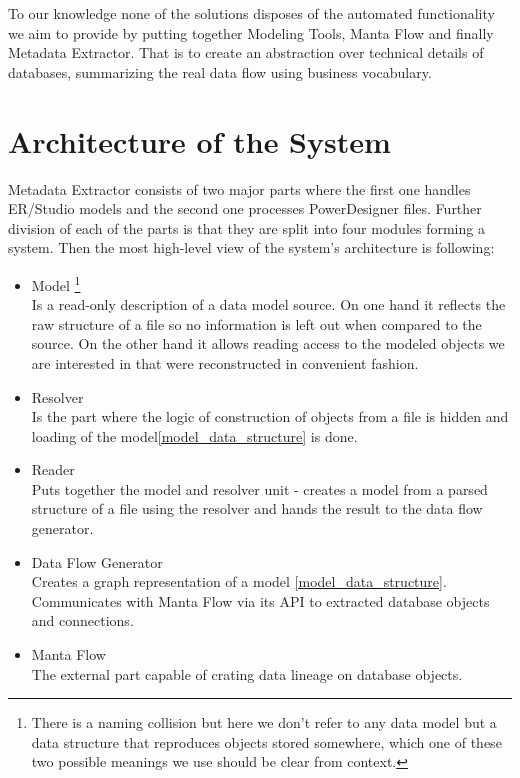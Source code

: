 To our knowledge none of the solutions disposes of the automated functionality we aim to provide by putting together Modeling Tools, Manta Flow and finally Metadata Extractor. That is to create an abstraction over technical details of databases, summarizing the real data flow using business vocabulary.

\section{Architecture of the System}

Metadata Extractor consists of two major parts where the first one handles ER/Studio models and the second one processes PowerDesigner files.
Further division of each of the parts is that they are split into four modules forming a system. 
Then the most high-level view of the system's architecture is following:
\begin{itemize}
	\item Model \label{model_data_structure}\footnote{There is a naming collision but here we don't refer to any data model but a data structure that reproduces objects stored somewhere, which one of these two possible meanings we use should be clear from context.}\\ 
	Is a read-only description of a data model source. On one hand it reflects the raw structure of a file so no information is left out when compared to the source. 
	On the other hand it allows reading access to the modeled objects we are interested in that were reconstructed in convenient fashion. 
	\item Resolver \\ 
	Is the part where the logic of construction of objects from a file is hidden and loading of the model\ref{model_data_structure} is done. 
	\item Reader \\
	Puts together the model and resolver unit - creates a model from a parsed structure of a file using the resolver and hands the result to the data flow generator.
	\item Data Flow Generator \\ 
	Creates a graph representation of a model \ref{model_data_structure}. Communicates with Manta Flow via its API to extracted database objects and connections.
	\item Manta Flow \\
	The external part capable of crating data lineage on database objects.
\end{itemize}
